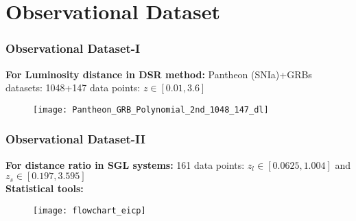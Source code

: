 \documentclass[10pt,xcolor={dvipsnames}]{beamer}
\begin{document}
 \section{ Observational Dataset}
\begin{frame}
 \frametitle{Observational Dataset-I}

  \textbf{For Luminosity distance in DSR method:} Pantheon (SNIa)+GRBs datasets: 1048+147 data points: $z\in[0.01,3.6]$
 \begin{figure}[ht!]
\centering
\texttt{[image: Pantheon\_GRB\_Polynomial\_2nd\_1048\_147\_dl]}
\end{figure} 
 \end{frame}
\begin{frame}
 \frametitle{Observational Dataset-II}
 \textbf{For distance ratio in SGL systems:} 161 data points: \hspace*{3 cm}$z_l\in[0.0625,1.004]$ and \hspace*{0 cm}$z_s\in[0.197, 3.595]$
 \vspace{2mm}\\
 \textbf{Statistical tools:}
 \begin{figure}[ht!]
\centering
\texttt{[image: flowchart\_eicp]}
\end{figure} 
 \end{frame}
\end{document}
